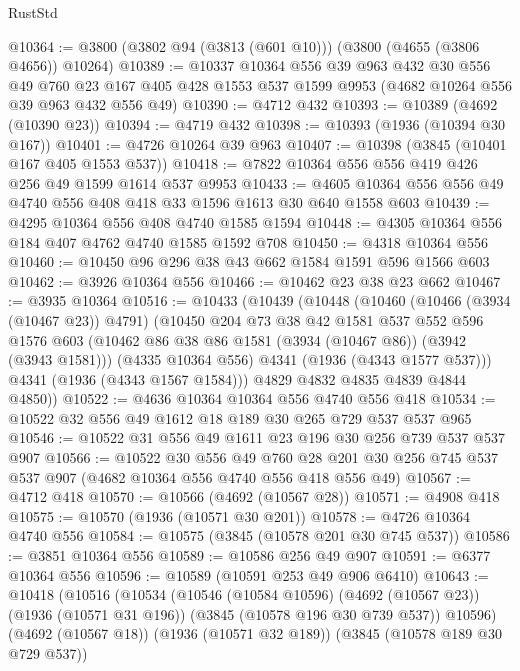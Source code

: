 \begin{lexlean}{RustStd}
\begin{coremodule}
@10364 := @3800 (@3802 @94 (@3813 (@601 @10))) (@3800 (@4655 (@3806 @4656)) @10264)
@10389 := @10337
    @10364
    @556
    @39
    @963
    @432
    @30
    @556
    @49
    @760
    @23
    @167
    @405
    @428
    @1553
    @537
    @1599
    @9953
    (@4682 @10264 @556 @39 @963 @432 @556 @49)
@10390 := @4712 @432
@10393 := @10389 (@4692 (@10390 @23))
@10394 := @4719 @432
@10398 := @10393 (@1936 (@10394 @30 @167))
@10401 := @4726 @10264 @39 @963
@10407 := @10398 (@3845 (@10401 @167 @405 @1553 @537))
@10418 := @7822 @10364 @556 @556 @419 @426 @256 @49 @1599 @1614 @537 @9953
@10433 := @4605 @10364 @556 @556 @49 @4740 @556 @408 @418 @33 @1596 @1613 @30 @640 @1558 @603
@10439 := @4295 @10364 @556 @408 @4740 @1585 @1594
@10448 := @4305 @10364 @556 @184 @407 @4762 @4740 @1585 @1592 @708
@10450 := @4318 @10364 @556
@10460 := @10450 @96 @296 @38 @43 @662 @1584 @1591 @596 @1566 @603
@10462 := @3926 @10364 @556
@10466 := @10462 @23 @38 @23 @662
@10467 := @3935 @10364
@10516 := @10433
    (@10439
      (@10448
        (@10460
          (@10466 (@3934 (@10467 @23)) @4791)
          (@10450
            @204
            @73
            @38
            @42
            @1581
            @537
            @552
            @596
            @1576
            @603
            (@10462 @86 @38 @86 @1581 (@3934 (@10467 @86)) (@3942 (@3943 @1581)))
            (@4335 @10364 @556)
            @4341
            (@1936 (@4343 @1577 @537)))
          @4341
          (@1936 (@4343 @1567 @1584)))
        @4829
        @4832
        @4835
        @4839
        @4844
        @4850))
@10522 := @4636 @10364 @10364 @556 @4740 @556 @418
@10534 := @10522 @32 @556 @49 @1612 @18 @189 @30 @265 @729 @537 @537 @965
@10546 := @10522 @31 @556 @49 @1611 @23 @196 @30 @256 @739 @537 @537 @907
@10566 := @10522
    @30
    @556
    @49
    @760
    @28
    @201
    @30
    @256
    @745
    @537
    @537
    @907
    (@4682 @10364 @556 @4740 @556 @418 @556 @49)
@10567 := @4712 @418
@10570 := @10566 (@4692 (@10567 @28))
@10571 := @4908 @418
@10575 := @10570 (@1936 (@10571 @30 @201))
@10578 := @4726 @10364 @4740 @556
@10584 := @10575 (@3845 (@10578 @201 @30 @745 @537))
@10586 := @3851 @10364 @556
@10589 := @10586 @256 @49 @907
@10591 := @6377 @10364 @556
@10596 := @10589 (@10591 @253 @49 @906 @6410)
@10643 := @10418
    (@10516
      (@10534
        (@10546
          (@10584 @10596)
          (@4692 (@10567 @23))
          (@1936 (@10571 @31 @196))
          (@3845 (@10578 @196 @30 @739 @537))
          @10596)
        (@4692 (@10567 @18))
        (@1936 (@10571 @32 @189))
        (@3845 (@10578 @189 @30 @729 @537))

\end{coremodule}
\end{lexlean}
